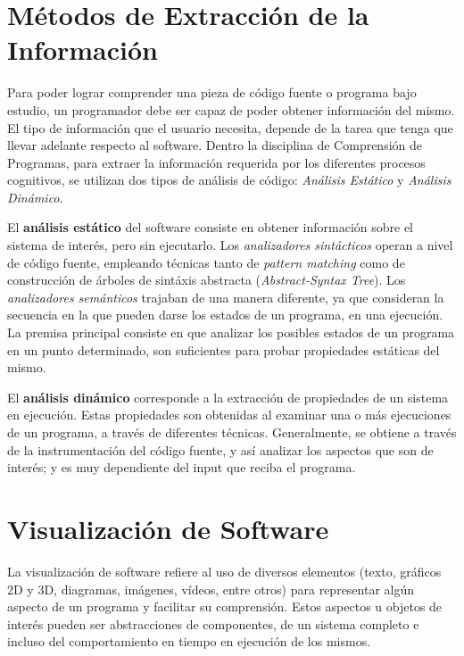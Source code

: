 \section{Métodos de Extracción de la Información}

Para poder lograr comprender una pieza de código fuente o programa bajo estudio, un
programador debe ser capaz de poder obtener información del mismo.
El tipo de información que el usuario necesita, depende de la tarea que tenga que llevar
adelante respecto al software.
Dentro la disciplina de Comprensión de Programas, para extraer la información requerida 
por los diferentes procesos cognitivos, se utilizan dos tipos de análisis de código:
\textit{Análisis Estático} y \textit{Análisis Dinámico}.

El \textbf{análisis estático} del software consiste en obtener información sobre el 
sistema de interés, pero sin ejecutarlo.
Los \textit{analizadores sintácticos} operan a nivel de código fuente, empleando
técnicas tanto de \textit{pattern matching} como de construcción de árboles de sintáxis
abstracta (\textit{Abstract-Syntax Tree}).
Los \textit{analizadores semánticos} trajaban de una manera diferente, ya que consideran
la secuencia en la que pueden darse los estados de un programa, en una ejecución.
La premisa principal consiste en que analizar los posibles estados de un programa en un
punto determinado, son suficientes para probar propiedades estáticas del mismo.
\cite{Cousot77}

El \textbf{análisis dinámico} corresponde a la extracción de propiedades de un sistema
en ejecución.
Estas propiedades son obtenidas al examinar una o más ejecuciones de un programa, a
través de diferentes técnicas.
Generalmente, se obtiene a través de la instrumentación del código fuente, y así
analizar los aspectos que son de interés; y es muy dependiente del input que reciba
el programa.
\cite{Ball99}

\section{Visualización de Software}

La visualización de software refiere al uso de diversos elementos (texto, 
gráficos 2D y 3D, diagramas, imágenes, vídeos, entre otros) para representar algún
aspecto de un programa y facilitar su comprensión.\cite{PetreDeQuincey06,Chen06,GomezHenriquez01}
Estos aspectos u objetos de interés pueden ser abstracciones de componentes, de
un sistema completo e incluso del comportamiento en tiempo en ejecución de los
mismos. \cite{TeysereCampo09}

